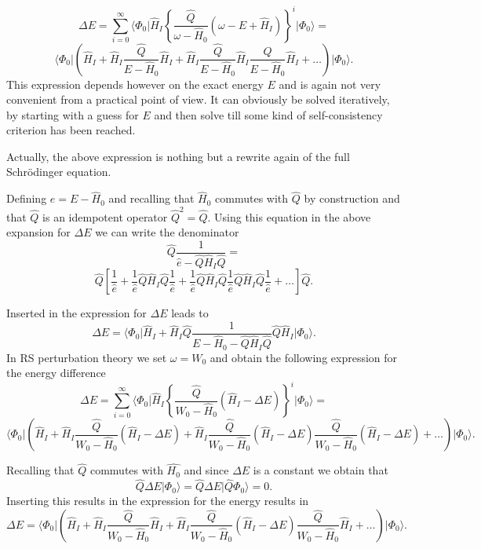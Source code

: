 \documentclass[%
twoside,                 %
final,                   %
10pt]{article}
\begin{document}
\[
\Delta E=\sum_{i=0}^{\infty}\langle \Phi_0\vert \hat{H}_I\left\{\frac{\hat{Q}}{\omega-\hat{H}_0}\left(\omega-E+\hat{H}_I\right)\right\}^i\vert \Phi_0\rangle=\]
\[
\langle \Phi_0\vert \left(\hat{H}_I+\hat{H}_I\frac{\hat{Q}}{E-\hat{H}_0}\hat{H}_I+
\hat{H}_I\frac{\hat{Q}}{E-\hat{H}_0}\hat{H}_I\frac{\hat{Q}}{E-\hat{H}_0}\hat{H}_I+\dots\right)\vert \Phi_0\rangle. 
\]
This expression depends however on the exact energy $E$ and is again not very convenient from a practical point of view. It can obviously be solved iteratively, by starting with a guess for  $E$ and then solve till some kind of self-consistency criterion has been reached. 

Actually, the above expression is nothing but a rewrite again of the full Schr\"odinger equation. 

Defining $e=E-\hat{H}_0$ and recalling that $\hat{H}_0$ commutes with 
$\hat{Q}$ by construction and that $\hat{Q}$ is an idempotent operator
$\hat{Q}^2=\hat{Q}$. 
Using this equation in the above expansion for $\Delta E$ we can write the denominator 
\[
\hat{Q}\frac{1}{\hat{e}-\hat{Q}\hat{H}_I\hat{Q}}=
\]
\[
\hat{Q}\left[\frac{1}{\hat{e}}+\frac{1}{\hat{e}}\hat{Q}\hat{H}_I\hat{Q}
\frac{1}{\hat{e}}+\frac{1}{\hat{e}}\hat{Q}\hat{H}_I\hat{Q}
\frac{1}{\hat{e}}\hat{Q}\hat{H}_I\hat{Q}\frac{1}{\hat{e}}+\dots\right]\hat{Q}.
\]

Inserted in the expression for $\Delta E$ leads to 
\[
\Delta E=
\langle \Phi_0\vert \hat{H}_I+\hat{H}_I\hat{Q}\frac{1}{E-\hat{H}_0-\hat{Q}\hat{H}_I\hat{Q}}\hat{Q}\hat{H}_I\vert \Phi_0\rangle. 
\]
In RS perturbation theory we set $\omega = W_0$ and obtain the following expression for the energy difference
\[
\Delta E=\sum_{i=0}^{\infty}\langle \Phi_0\vert \hat{H}_I\left\{\frac{\hat{Q}}{W_0-\hat{H}_0}\left(\hat{H}_I-\Delta E\right)\right\}^i\vert \Phi_0\rangle=
\]
\[
\langle \Phi_0\vert \left(\hat{H}_I+\hat{H}_I\frac{\hat{Q}}{W_0-\hat{H}_0}(\hat{H}_I-\Delta E)+
\hat{H}_I\frac{\hat{Q}}{W_0-\hat{H}_0}(\hat{H}_I-\Delta E)\frac{\hat{Q}}{W_0-\hat{H}_0}(\hat{H}_I-\Delta E)+\dots\right)\vert \Phi_0\rangle.
\]



Recalling that $\hat{Q}$ commutes with $\hat{H_0}$ and since $\Delta E$ is a constant we obtain that
\[
\hat{Q}\Delta E\vert \Phi_0\rangle = \hat{Q}\Delta E\vert \hat{Q}\Phi_0\rangle = 0.
\]
Inserting this results in the expression for the energy results in
\[
\Delta E=\langle \Phi_0\vert \left(\hat{H}_I+\hat{H}_I\frac{\hat{Q}}{W_0-\hat{H}_0}\hat{H}_I+
\hat{H}_I\frac{\hat{Q}}{W_0-\hat{H}_0}(\hat{H}_I-\Delta E)\frac{\hat{Q}}{W_0-\hat{H}_0}\hat{H}_I+\dots\right)\vert \Phi_0\rangle.
\]
\end{document}
